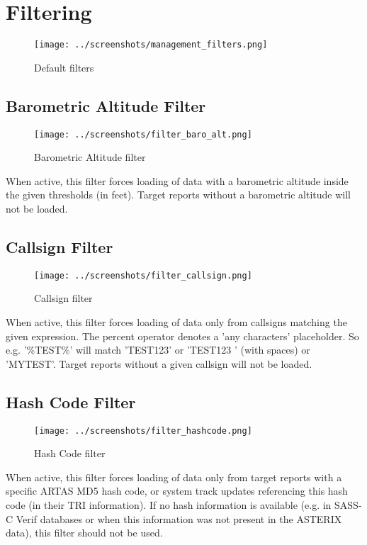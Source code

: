 \section{Filtering}
\label{sec:filtering}

\begin{figure}[H]
  \center
    \texttt{[image: ../screenshots/management\_filters.png]}
  \caption{Default filters}
\end{figure}

\subsection{Barometric Altitude Filter}

\begin{figure}[H]
  \center
    \texttt{[image: ../screenshots/filter\_baro\_alt.png]}
  \caption{Barometric Altitude filter}
\end{figure}

When active, this filter forces loading of data with a barometric altitude inside the given thresholds (in feet). Target reports without a barometric altitude will not be loaded.

\subsection{Callsign Filter}

\begin{figure}[H]
  \center
    \texttt{[image: ../screenshots/filter\_callsign.png]}
  \caption{Callsign filter}
\end{figure}

When active, this filter forces loading of data only from callsigns matching the given expression. The percent operator denotes a 'any characters' placeholder. So e.g. '\%TEST\%' will match 'TEST123' or 'TEST123   ' (with spaces) or 'MYTEST'. Target reports without a given callsign will not be loaded.

\subsection{Hash Code Filter}

\begin{figure}[H]
  \center
    \texttt{[image: ../screenshots/filter\_hashcode.png]}
  \caption{Hash Code filter}
\end{figure}

When active, this filter forces loading of data only from target reports with a specific ARTAS MD5 hash code, or system track updates referencing this hash code (in their TRI information). If no hash information is available (e.g. in SASS-C Verif databases or when this information was not present in the ASTERIX data), this filter should not be used.

